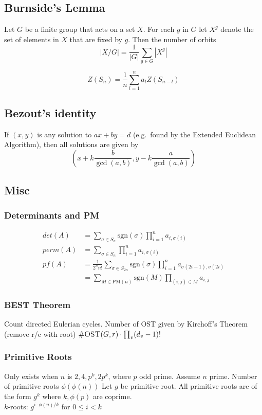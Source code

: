 \documentclass[13pt,a4paper]{article}
\begin{document}
\begin{landscape}
\begin{multicols*}{3}
\subsection{Burnside's Lemma}
Let $G$ be a finite group that acts on a set $X$. For each $g$ in $G$
let $X^g$ denote the set of elements in $X$ that are fixed by $g$. Then
the number of orbits \[ |X/G| = \frac{1}{|G|} \sum_{g\in G} |X^g| \]

\[
Z(S_n) = \frac{1}{n} \sum_{l=1}^n a_l Z(S_{n-l})
\]

\subsection{Bezout's identity}
If $(x,y)$ is any solution to $ax+by=d$ (e.g.\ found by the Extended
Euclidean Algorithm), then all solutions are given by \[
\left(x+k\frac{b}{\gcd(a,b)}, y-k\frac{a}{\gcd(a,b)}\right) \]

\subsection{Misc}
\subsubsection{Determinants and PM}
\begin{align*}
det(A) &= \sum_{\sigma \in S_n}\text{sgn}(\sigma)\prod_{i = 1}^n a_{i,\sigma(i)}\\
perm(A) &= \sum_{\sigma \in S_n} \prod_{i = 1}^n a_{i,\sigma(i)}\\
pf(A) &= \frac{1}{2^nn!}\sum_{\sigma \in S_{2n}} \text{sgn}(\sigma)\prod_{i = 1}^n a_{\sigma(2i-1),\sigma(2i)}\\ &= \sum_{M \in \text{PM}(n)} \text{sgn}(M) \prod_{(i,j) \in M} a_{i,j}
\end{align*}

\subsubsection{BEST Theorem}
Count directed Eulerian cycles. Number of OST given by
Kirchoff's Theorem (remove r/c with root) $\#\textsc{OST}(G,r)
\cdot \prod_{v}(d_v-1)!$

\subsubsection{Primitive Roots}
Only exists when $n$ is $2, 4, p^k, 2p^k$, where $p$ odd prime. Assume
$n$ prime. Number of primitive roots $\phi(\phi(n))$
Let $g$ be primitive root. All primitive roots are of the form $g^k$
where $k,\phi(p)$ are coprime.\\ $k$-roots:
$g^{i \cdot \phi(n) / k}$ for $0 \leq i < k$

\end{multicols*}
\end{landscape}
\end{document}
